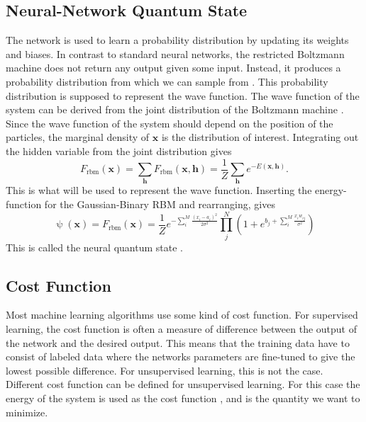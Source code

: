 \subsection{Neural-Network Quantum State}
The network is used to learn a probability distribution by updating its weights and biases. In contrast to standard neural networks, the restricted Boltzmann machine does not return any output given some input. Instead, it produces a probability distribution from which we can sample from \cite{mhj_ml}. 
This probability distribution is supposed to represent the wave function. The wave function of the system can be derived from the joint distribution of the Boltzmann machine \cite{mhj_ml}. Since the wave function of the system should depend on the position of the particles, the marginal density of $\boldsymbol{x}$ is the distribution of interest. Integrating out the hidden variable from the joint distribution gives
\begin{equation}
    F_\text{rbm}(\boldsymbol{x}) = \sum_{\boldsymbol{h}}F_\text{rbm}(\boldsymbol{x, h}) = \frac{1}{Z}\sum_{\boldsymbol{h}}e^{-E(\boldsymbol{x,h})}.
\end{equation}
This is what will be used to represent the wave function. 
Inserting the energy-function for the Gaussian-Binary RBM and rearranging, gives
\begin{equation}
    \uppsi(\boldsymbol{x}) = F_{\text{rbm}}(\boldsymbol{x}) = \frac{1}{Z}e^{-\sum_i^M\frac{(x_i - a_i)^2}{2\sigma^2}}\prod_j^N\left(1 + e^{b_j + \sum_i^M\frac{x_iw_{ij}}{\sigma^2}}\right)
\end{equation}
This is called the neural quantum state \cite{carleo}.
\subsection{Cost Function}
Most machine learning algorithms use some kind of cost function. For supervised learning, the cost function is often a measure of difference between the output of the network and the desired output. This means that the training data have to consist of labeled data where the networks parameters are fine-tuned to give the lowest possible difference. For unsupervised learning, this is not the case. Different cost function can be defined for unsupervised learning. For this case the energy of the system is used as the cost function \cite{mhj_ml}, and is the quantity we want to minimize. 
